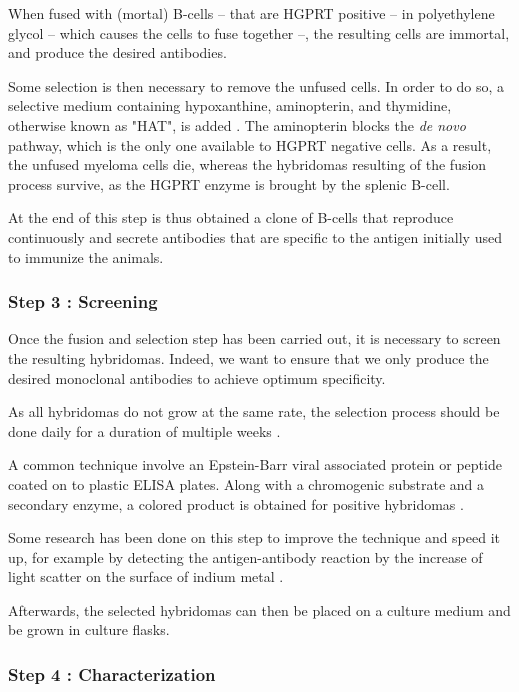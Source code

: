 When fused with (mortal) B-cells -- that are HGPRT positive --
in polyethylene glycol -- which causes the cells to fuse together --,
the resulting cells are immortal, and produce the desired antibodies.

Some selection is then necessary to remove the unfused cells. In order
to do so, a selective medium containing hypoxanthine, aminopterin, and 
thymidine, otherwise known as "HAT", is added \cite{nelson_monoclonal_2000}. 
The aminopterin blocks the \emph{de novo} pathway, which is the only one 
available to HGPRT negative cells. As a result, the unfused myeloma cells die,
whereas the hybridomas resulting of the fusion process survive, as the
HGPRT enzyme is brought by the splenic B-cell.

At the end of this step is thus obtained a clone of B-cells that reproduce
continuously and secrete antibodies that are specific to the antigen
initially used to immunize the animals.

\subsubsection{Step 3 : Screening}

Once the fusion and selection step has been carried out, it is necessary
to screen the resulting hybridomas. Indeed, we want to ensure that we
only produce the desired monoclonal antibodies to achieve optimum
specificity.

As all hybridomas do not grow at the same rate, the selection process
should be done daily for a duration of multiple weeks \cite{nelson_monoclonal_2000}.

A common technique involve an Epstein-Barr viral associated protein or peptide
coated on to plastic ELISA plates. Along with a chromogenic substrate and a
secondary enzyme, a colored product is obtained
for positive hybridomas \cite{grunow_cell_1994} \cite{nelson_monoclonal_2000}.

Some research has been done on this step to improve the technique and
speed it up, for example by detecting the antigen-antibody reaction by the 
increase of light scatter on the surface of indium metal \cite{rej_screening_1988}.

Afterwards, the selected hybridomas can then be placed on a culture medium
and be grown in culture flasks.

\subsubsection{Step 4 : Characterization}

